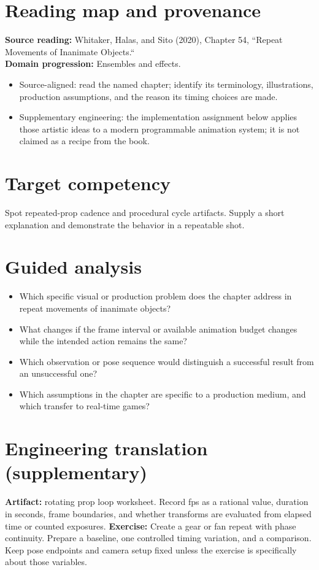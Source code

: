 \documentclass[10pt,letterpaper]{article}
\begin{document}
\makedoctitle
\makedocsummary

\section{Reading map and provenance}
\textbf{Source reading:} Whitaker, Halas, and Sito (2020), Chapter 54, ``Repeat Movements of Inanimate Objects.``\\
\textbf{Domain progression:} Ensembles and effects.
\begin{itemize}
\item Source-aligned: read the named chapter; identify its terminology, illustrations, production assumptions, and the reason its timing choices are made.
\item Supplementary engineering: the implementation assignment below applies those artistic ideas to a modern programmable animation system; it is not claimed as a recipe from the book.
\end{itemize}
\section{Target competency}
Spot repeated-prop cadence and procedural cycle artifacts. Supply a short explanation and demonstrate the behavior in a repeatable shot.
\section{Guided analysis}
\begin{itemize}
\item Which specific visual or production problem does the chapter address in repeat movements of inanimate objects?
\item What changes if the frame interval or available animation budget changes while the intended action remains the same?
\item Which observation or pose sequence would distinguish a successful result from an unsuccessful one?
\item Which assumptions in the chapter are specific to a production medium, and which transfer to real-time games?
\end{itemize}
\section{Engineering translation (supplementary)}
\textbf{Artifact:} rotating prop loop worksheet. Record fps as a rational value, duration in seconds, frame boundaries, and whether transforms are evaluated from elapsed time or counted exposures.
\textbf{Exercise:} Create a gear or fan repeat with phase continuity. Prepare a baseline, one controlled timing variation, and a comparison. Keep pose endpoints and camera setup fixed unless the exercise is specifically about those variables.
\end{document}
